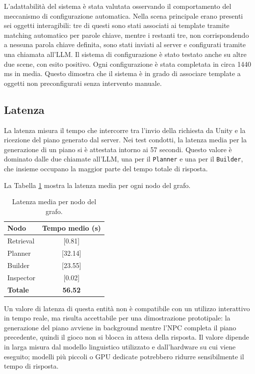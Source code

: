 L'adattabilità del sistema è stata valutata osservando il comportamento del meccanismo di configurazione automatica. Nella scena principale erano presenti sei oggetti interagibili: tre di questi sono stati associati ai template tramite matching automatico per parole chiave, mentre i restanti tre, non corrispondendo a nessuna parola chiave definita, sono stati inviati al server e configurati tramite una chiamata all'LLM. Il sistema di configurazione è stato testato anche su altre due scene, con esito positivo. Ogni configurazione è stata completata in circa 1440 ms in media. Questo dimostra che il sistema è in grado di associare template a oggetti non preconfigurati senza intervento manuale.

\subsection{Latenza}

La latenza misura il tempo che intercorre tra l'invio della richiesta da Unity e la ricezione del piano generato dal server. Nei test condotti, la latenza media per la generazione di un piano si è attestata intorno ai 57 secondi. Questo valore è dominato dalle due chiamate all'LLM, una per il \texttt{Planner} e una per il \texttt{Builder}, che insieme occupano la maggior parte del tempo totale di risposta.

La Tabella \ref{tab:latenza} mostra la latenza media per ogni nodo del grafo.

\begin{table}[H]
	\centering
	\caption{Latenza media per nodo del grafo.}
	\label{tab:latenza}
	\begin{tabular}{|l|c|}
		\hline
		\textbf{Nodo} & \textbf{Tempo medio (s)} \\
		\hline
		Retrieval & [0.81] \\
		Planner & [32.14] \\
		Builder & [23.55] \\
		Inspector & [0.02] \\
		\hline
		\textbf{Totale} & \textbf{56.52} \\
		\hline
	\end{tabular}
\end{table}

Un valore di latenza di questa entità non è compatibile con un utilizzo interattivo in tempo reale, ma risulta accettabile per una dimostrazione prototipale: la generazione del piano avviene in background mentre l'NPC completa il piano precedente, quindi il gioco non si blocca in attesa della risposta. Il valore dipende in larga misura dal modello linguistico utilizzato e dall'hardware su cui viene eseguito; modelli più piccoli o GPU dedicate potrebbero ridurre sensibilmente il tempo di risposta.

